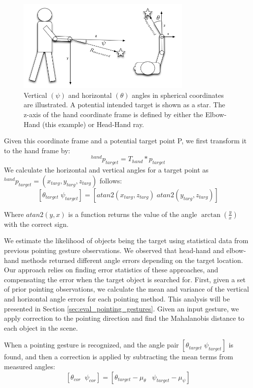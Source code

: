 \documentclass{tADR2e}
\begin{document}
\begin{figure}[h!]
\centering
\includegraphics[width=85mm]{pics/person_angles_combined_2.png}
\caption{Vertical $(\psi)$ and horizontal $(\theta)$ angles in spherical coordinates are illustrated. A potential intended target is shown as a star. The z-axis of the hand coordinate frame is defined by either the Elbow-Hand (this example) or Head-Hand ray.}
\label{fig:angle_errors}
\end{figure}

Given this coordinate frame and a potential target point P, we first transform it to the hand frame by:
$$^{hand}p_{target} = T_{hand} * p_{target}$$
We calculate the horizontal and vertical angles for a target point as $^{hand}p_{target} = (x_{targ}, y_{targ}, z_{targ})$ follows:
$$[\theta_{target}\;\psi_{target}]=[atan2(x_{targ}, z_{targ})\;atan2(y_{targ}, z_{targ})]$$

Where $atan2(y,x)$ is a function returns the value of the angle $\arctan(\frac{y}{x})$ with the correct sign.

We estimate the likelihood of objects being the target using statistical data from previous pointing gesture observations. We observed that head-hand and elbow-hand methods returned different angle errors depending on the target location. Our approach relies on finding error statistics of these approaches, and compensating the error when the target object is searched for. First, given a set of prior pointing observations, we calculate the mean and variance of the vertical and horizontal angle errors for each pointing method. This analysis will be presented in Section \ref{sec:eval_pointing_gestures}. Given an input gesture, we apply correction to the pointing direction and find the Mahalanobis distance to each object in the scene.

When a pointing gesture is recognized, and the angle pair $[\theta_{target}\;\psi_{target}]$ is found, and then a correction is applied by subtracting the mean terms from measured angles:
$$[\theta_{cor}\;\;\psi_{cor}]=[\theta_{target}-\mu_{\theta}\;\;\;\psi_{target}-\mu_{\psi}]$$
 
\end{document}
